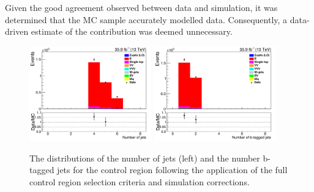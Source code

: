 Given the good agreement observed between data and simulation, it was determined that the \ttbar MC sample accurately modelled data.
Consequently, a data-driven estimate of the \ttbar contribution was deemed unnecessary.

\begin{figure}[h]
\centering
\includegraphics[width=0.47\textwidth]{figs/background-estimation/plots/unblinded/ttbar_control/numbJets_SingleTop_wMass_emu.pdf}
\includegraphics[width=0.47\textwidth]{figs/background-estimation/plots/unblinded/ttbar_control/numbBJets_SingleTop_wMass_emu.pdf}
\caption{
The distributions of the number of jets (left) and the number b-tagged jets for the \ttbar control region following the application of the full control region selection criteria and simulation corrections.
}
\label{fig:ttbarCR_nJets}
\end{figure}

